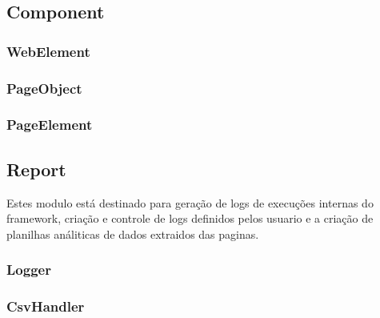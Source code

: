     \subsection{Component}


        \subsubsection{WebElement}
        \subsubsection{PageObject}
        \subsubsection{PageElement}

    \subsection{Report}

        Estes modulo está destinado para geração de logs de execuções internas do framework, criação e controle
        de logs definidos pelos usuario e a criação de planilhas análiticas de dados extraidos das paginas.

        \subsubsection{Logger}
        \subsubsection{CsvHandler}
